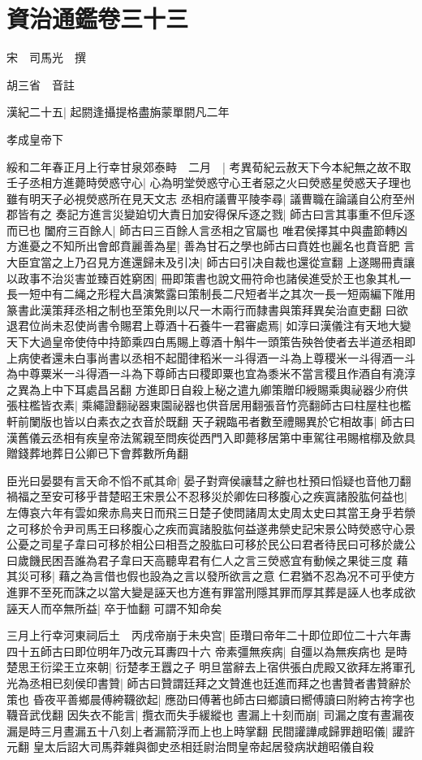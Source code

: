 \section{資治通鑑卷三十三}
宋　司馬光　撰

胡三省　音註

漢紀二十五|{
	起閼逢攝提格盡旃蒙單閼凡二年}


孝成皇帝下

綏和二年春正月上行幸甘泉郊泰畤　二月　|{
	考異荀紀云赦天下今本紀無之故不取}
壬子丞相方進薨時熒惑守心|{
	心為明堂熒惑守心王者惡之火曰熒惑星熒惑天子理也雖有明天子必視熒惑所在見天文志}
丞相府議曹平陵李尋|{
	議曹職在論議自公府至州郡皆有之}
奏記方進言災變廹切大責日加安得保斥逐之戮|{
	師古曰言其事重不但斥逐而已也}
闔府三百餘人|{
	師古曰三百餘人言丞相之官屬也}
唯君侯擇其中與盡節轉凶方進憂之不知所出會郎賁麗善為星|{
	善為甘石之學也師古曰賁姓也麗名也賁音肥}
言大臣宜當之上乃召見方進還歸未及引决|{
	師古曰引决自裁也還從宣翻}
上遂賜冊責讓以政事不治災害並臻百姓窮困|{
	冊即策書也說文冊符命也諸侯進受於王也象其札一長一短中有二䋲之形程大昌演繁露曰策制長二尺短者半之其次一長一短兩編下陮用篆書此漢策拜丞相之制也至策免則以尺一木兩行而隸書與策拜異矣治直吏翻}
曰欲退君位尚未忍使尚書令賜君上尊酒十石養牛一君審處焉|{
	如淳曰漢儀注有天地大變天下大過皇帝使侍中持節乘四白馬賜上尊酒十斛牛一頭策告殃咎使者去半道丞相即上病使者還未白事尚書以丞相不起聞律稻米一斗得酒一斗為上尊稷米一斗得酒一斗為中尊粟米一斗得酒一斗為下尊師古曰稷即粟也宜為黍米不當言稷且作酒自有澆淳之異為上中下耳處昌呂翻}
方進即日自殺上秘之遣九卿策贈印綬賜乘輿祕器少府供張柱檻皆衣素|{
	乘繩證翻祕器東園祕器也供音居用翻張音竹亮翻師古曰柱屋柱也檻軒前闌版也皆以白素衣之衣音於既翻}
天子親臨弔者數至禮賜異於它相故事|{
	師古曰漢舊儀云丞相有疾皇帝法駕親至問疾從西門入即薨移居第中車駕往弔賜棺槨及歛具贈錢葬地葬日公卿已下會葬數所角翻}


臣光曰晏嬰有言天命不慆不貳其命|{
	晏子對齊侯禳彗之辭也杜預曰慆疑也音他刀翻}
禍福之至安可移乎昔楚昭王宋景公不忍移災於卿佐曰移腹心之疾寘諸股肱何益也|{
	左傳哀六年有雲如衆赤鳥夹日而飛三日楚子使問諸周太史周太史曰其當王身乎若禜之可移於令尹司馬王曰移腹心之疾而寘諸股肱何益遂弗禜史記宋景公時熒惑守心景公憂之司星子韋曰可移於相公曰相吾之股肱曰可移於民公曰君者待民曰可移於歲公曰歲饑民困吾誰為君子韋曰天高聽卑君有仁人之言三熒惑宜有動候之果徙三度}
藉其災可移|{
	藉之為言借也假也設為之言以發所欲言之意}
仁君猶不忍為况不可乎使方進罪不至死而誅之以當大變是誣天也方進有罪當刑隱其罪而厚其葬是誣人也孝成欲誣天人而卒無所益|{
	卒于恤翻}
可謂不知命矣

三月上行幸河東祠后土　丙戌帝崩于未央宫|{
	臣瓚曰帝年二十即位即位二十六年夀四十五師古曰即位明年乃改元耳夀四十六}
帝素彊無疾病|{
	自彊以為無疾病也}
是時楚思王衍梁王立來朝|{
	衍楚孝王囂之子}
明旦當辭去上宿供張白虎殿又欲拜左將軍孔光為丞相已刻侯印書贊|{
	師古曰贊謂廷拜之文贊進也廷進而拜之也書贊者書贊辭於策也}
昏夜平善鄉晨傅絝韈欲起|{
	應劭曰傅著也師古曰鄉讀曰嚮傅讀曰附絝古袴字也韈音武伐翻}
因失衣不能言|{
	攬衣而失手緩縱也}
晝漏上十刻而崩|{
	司漏之度有晝漏夜漏是時三月晝漏五十八刻上者漏箭浮而上也上時掌翻}
民間讙譁咸歸罪趙昭儀|{
	讙許元翻}
皇太后詔大司馬莽雜與御史丞相廷尉治問皇帝起居發病狀趙昭儀自殺

